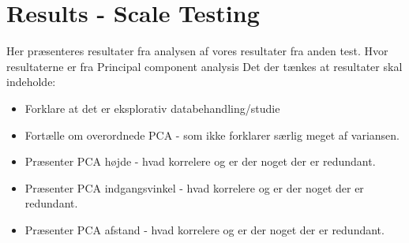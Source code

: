 \section{{\color{red}Results - Scale Testing}}
\label{ResultsScaleTesting}
%
{\color{red} Her præsenteres resultater fra analysen af vores resultater fra anden test. Hvor resultaterne er fra Principal component analysis}
%
Det der tænkes at resultater skal indeholde: 
\begin{itemize}
	\item Forklare at det er eksplorativ databehandling/studie
	\item Fortælle om overordnede PCA - som ikke forklarer særlig meget af variansen.
	\item Præsenter PCA højde - hvad korrelere og er der noget der er redundant.
	\item Præsenter PCA indgangsvinkel - hvad korrelere og er der noget der er redundant.
	\item Præsenter PCA afstand - hvad korrelere og er der noget der er redundant.
\end{itemize}